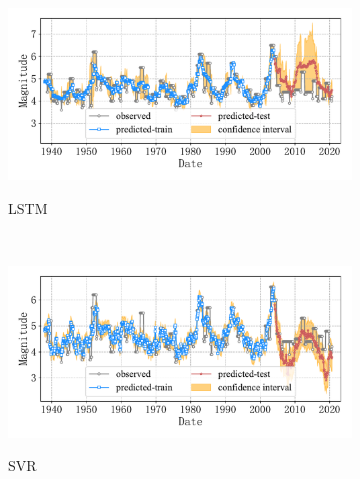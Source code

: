 \begin{figure}[!htbp]
  \centering
  \begin{subfigure}[b]{0.45\textwidth}
    \caption{LSTM}
    \vspace{-0.2cm}
    \includegraphics[width=\textwidth]{Img/chap5_seism/block2/seism_lstm_minyear_1932_maxyear_2021_spanlat_2_spanlon_4_timewindow_72_nextmonth_12_minmag_3.0_block_2.pdf}
    \vspace{-1cm}
    \label{fig:seism_lstm_minyear_1932_maxyear_2021_spanlat_2_spanlon_4_timewindow_72_nextmonth_12_minmag_3.0_block_2}
  \end{subfigure}
  ~
  \begin{subfigure}[b]{0.45\textwidth}
    \caption{SVR} 
    \vspace{-0.2cm}
    \includegraphics[width=\textwidth]{Img/chap5_seism/block2/seism_svr_minyear_1932_maxyear_2021_spanlat_2_spanlon_4_timewindow_72_nextmonth_12_minmag_3.0_block_2.pdf}
    \vspace{-1cm}
    \label{fig:seism_svr_minyear_1932_maxyear_2021_spanlat_2_spanlon_4_timewindow_72_nextmonth_12_minmag_3.0_block_2}
  \end{subfigure}   
  \\
  \begin{subfigure}[b]{0.45\textwidth}

\end{subfigure}
\end{figure}
